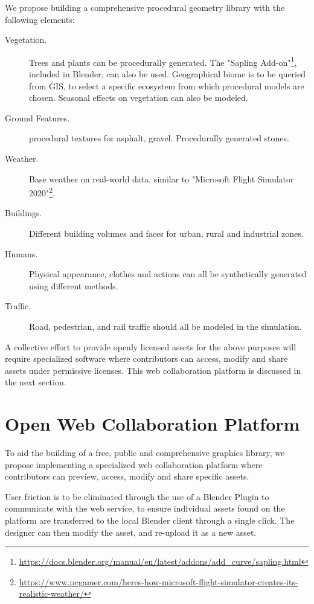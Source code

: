 We propose building a comprehensive procedural geometry library with the following elements:
\begin{description}
  \item[Vegetation.] Trees\cite{hewitt2017proceduralTrees} and plants\cite{barth2018data} can be procedurally generated. The "Sapling Add-on"\footnote{\url{https://docs.blender.org/manual/en/latest/addons/add_curve/sapling.html}}, included in Blender, can also be used. Geographical biome is to be queried from GIS, to select a specific ecosystem from which procedural models are chosen. Seasonal effects on vegetation can also be modeled.
  \item[Ground Features.] procedural textures for asphalt, gravel. Procedurally generated stones.
  \item[Weather.] Base weather on real-world data, similar to "Microsoft Flight Simulator 2020"\footnote{\url{https://www.pcgamer.com/heres-how-microsoft-flight-simulator-creates-its-realistic-weather/}}. 
  \item[Buildings.] Different building volumes and faces for urban, rural and industrial zones.
  \item[Humans.] Physical appearance, clothes and actions can all be synthetically generated using different methods.
  \item[Traffic.] Road, pedestrian, and rail traffic should all be modeled in the simulation.
\end{description}

A collective effort to provide openly licensed assets for the above purposes will require specialized software where contributors can access, modify and share assets under permissive licenses. This web collaboration platform is discussed in the next section.

\section{Open Web Collaboration Platform}
\label{sec:future-open-web-collaboration-platform}

To aid the building of a free, public and comprehensive graphics library, we propose implementing a specialized web collaboration platform where contributors can preview, access, modify and share specific assets.

User friction is to be eliminated through the use of a Blender Plugin to communicate with the web service, to ensure individual assets found on the platform are transferred to the local Blender client through a single click. The designer can then modify the asset, and re-upload it as a new asset.

